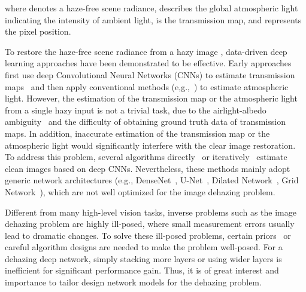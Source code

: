 \documentclass[10pt,twocolumn,letterpaper]{article}
\begin{document}
  where  denotes a haze-free scene radiance,  describes the global atmospheric light indicating the intensity of ambient light,  is the transmission map, and  represents the pixel position.
  
  To restore the haze-free scene radiance  from a hazy image ,
  data-driven deep learning approaches have been demonstrated to be effective.
Early approaches first use deep Convolutional Neural Networks (CNNs)
to estimate transmission maps~\cite{deep_physical1, MSCNN, DCPDN, AOD, deep_physical_unsupervised1, jinshan_dual} and then apply conventional methods (e,g.,~\cite{He_dark}) to estimate atmospheric light.
However, the estimation of the transmission map or the atmospheric light from a single hazy input is not a trivial task, due to the airlight-albedo ambiguity~\cite{VHaze} and the difficulty of obtaining ground truth data of transmission maps.
In addition, inaccurate estimation of the transmission map or the atmospheric light would significantly interfere with the clear image restoration.
To address this problem, several algorithms directly~\cite{DcGAN, GFN, MsPPN, PFFNet, GCANet, cycledehaze, DuRN,griddehazenet} or iteratively~\cite{DeepPriorsDehaze, DPN} estimate clean images based on deep CNNs.
Nevertheless, these methods mainly adopt generic network architectures (e.g., DenseNet~\cite{MsPPN}, U-Net~\cite{PFFNet}, Dilated Network~\cite{GCANet}, Grid Network~\cite{griddehazenet}),
which are not well optimized for the image dehazing problem.


  Different from many high-level vision tasks, inverse problems such as the image dehazing problem are highly ill-posed, where small measurement errors usually lead to dramatic changes.
To solve these ill-posed problems, certain priors~\cite{tr_dehaze1,tr_dehaze3,He_dark, NLD} or careful algorithm designs are needed to make the problem well-posed.
For a dehazing deep network, simply stacking more layers or using wider layers is inefficient for significant performance gain.
Thus, it is of great interest and importance to tailor design network models for the dehazing problem.
  
\end{document}
